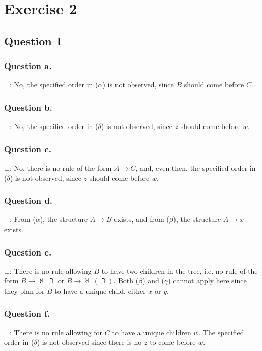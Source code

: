 \documentclass{cours}
\begin{document}
\section{Exercise 2}
\subsection{Question 1}
\tocless\subsubsection{Question a.}
$\bot$: No, the specified order in ($\alpha$) is not observed, since $B$ should come before $C$.

\tocless\subsubsection{Question b.}
$\bot$: No, the specified order in ($\delta$) is not observed, since $z$ should come before $w$.

\tocless\subsubsection{Question c.}
$\bot$: No, there is no rule of the form $A \rightarrow C$, and, even then, the specified order in ($\delta$) is not observed, since $z$ should come before $w$.

\tocless\subsubsection{Question d.}
$\top$: From ($\alpha$), the structure $A \rightarrow B$ exists, and from ($\beta$), the structure $A \rightarrow x$ exists.

\tocless\subsubsection{Question e.}
$\bot$: There is no rule allowing $B$ to have two \og children \fg in the tree, i.e. no rule of the form $B \rightarrow \aleph\ \beth$ or $B \rightarrow \aleph\ (\beth)$. Both ($\beta$) and ($\gamma$) cannot apply here since they plan for $B$ to have a unique child, either $x$ or $y$.

\tocless\subsubsection{Question f.}
$\bot$: There is no rule allowing for $C$ to have a unique children $w$. The specified order in ($\delta$) is not observed since there is no $z$ to come before $w$.
\end{document}
